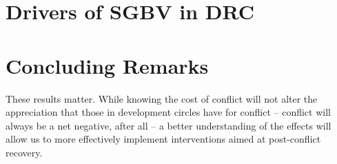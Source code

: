 \section{Drivers of SGBV in DRC}

\section{Concluding Remarks}


These results matter. While knowing the cost of conflict will not alter the appreciation that those in development circles have for conflict -- conflict will always be a net negative, after all -- a better understanding of the effects will allow us to more effectively implement interventions aimed at post-conflict recovery. 


